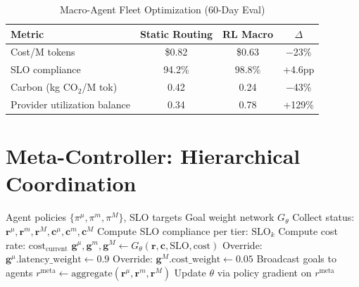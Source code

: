 \documentclass[conference,10pt]{IEEEtran}
\begin{document}
\begin{table}[!htbp]
\caption{Macro-Agent Fleet Optimization (60-Day Eval)}
\label{tab:macro}
\centering\scriptsize
\begin{tabular}{@{}lccc@{}}
\toprule
\textbf{Metric} & \textbf{Static Routing} & \textbf{RL Macro} & \textbf{$\Delta$} \\
\midrule
Cost/M tokens & \$0.82 & \$0.63 & $-$23\% \\
SLO compliance & 94.2\% & 98.8\% & +4.6pp \\
Carbon (kg CO$_2$/M tok) & 0.42 & 0.24 & $-$43\% \\
Provider utilization balance & 0.34 & 0.78 & +129\% \\
\bottomrule
\end{tabular}
\end{table}

\section{Meta-Controller: Hierarchical Coordination}
\label{sec:meta}



\begin{algorithm}[!t]
\caption{Meta-Controller Goal Allocation}
\label{alg:meta}
\begin{algorithmic}[1]
\Require Agent policies $\{\pi^\mu, \pi^m, \pi^M\}$, SLO targets
\Require Goal weight network $G_\theta$
    \State Collect status: $\mathbf{r}^\mu, \mathbf{r}^m, \mathbf{r}^M, \mathbf{c}^\mu, \mathbf{c}^m, \mathbf{c}^M$
    \State Compute SLO compliance per tier: $\text{SLO}_k$
    \State Compute cost rate: $\text{cost}_{\text{current}}$
    \State $\mathbf{g}^{\mu}, \mathbf{g}^{m}, \mathbf{g}^{M} \leftarrow G_\theta(\mathbf{r}, \mathbf{c}, \text{SLO}, \text{cost})$
     
        \State Override: $\mathbf{g}^{\mu}.\text{latency\_weight} \leftarrow 0.9$
        \State Override: $\mathbf{g}^{M}.\text{cost\_weight} \leftarrow 0.05$
    \EndIf
    \State Broadcast goals to agents
    \State $r^{\text{meta}} \leftarrow \text{aggregate}(\mathbf{r}^\mu, \mathbf{r}^m, \mathbf{r}^M)$
    \State Update $\theta$ via policy gradient on $r^{\text{meta}}$
\EndFor
\end{algorithmic}
\end{algorithm}
\end{document}
